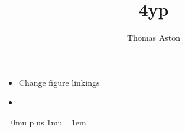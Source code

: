 \documentclass[12pt]{article}%
\title{4yp}
\author{Thomas Aston}
\begin{document}
  \maketitle
  \tableofcontents

\begin{itemize}
  \item Change figure linkings
  \item 
\end{itemize}

 
 


  























  


  \Urlmuskip=0mu plus 1mu
  \emergencystretch=1em
  \printbibliography{}
\end{document}
